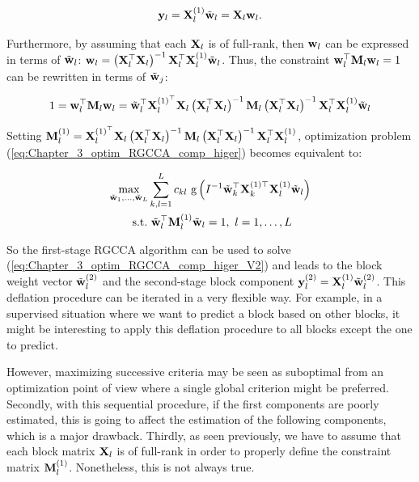 \documentclass[
]{jss}
\begin{document}
\begin{equation}
    \mathbf{y}_l = \mathbf{X}_l^{(1)}\tilde{\mathbf{w}}_l = \mathbf{X}_l\mathbf{w}_l.
\label{eq:Chapter_3_link_between_range_spaces}
\end{equation}

Furthermore, by assuming that each \(\mathbf{X}_l\) is of full-rank, then
\(\mathbf{w}_l\) can be expressed in terms of \(\tilde{\mathbf{w}}_l\):
\(\mathbf{w}_l = \left( \mathbf{X}_l^\top \mathbf{X}_l\right)^{-1}\mathbf{X}_l^\top\mathbf{X}_l^{(1)}\tilde{\mathbf{w}}_l\).
Thus, the constraint \(\mathbf{w}_l^\top\mathbf{M}_l\mathbf{w}_l = 1\) can be rewritten in terms
of \(\tilde{\mathbf{w}}_j\):

\begin{equation}
    1 = \mathbf{w}_l^\top\mathbf{M}_l\mathbf{w}_l = \tilde{\mathbf{w}}_l^\top\mathbf{X}_l^{(1)^\top} \mathbf{X}_l \left( \mathbf{X}_l^\top \mathbf{X}_l\right)^{-1}\mathbf{M}_l\left( \mathbf{X}_l^\top \mathbf{X}_l\right)^{-1}\mathbf{X}_l^\top\mathbf{X}_l^{(1)}\tilde{\mathbf{w}}_l
\label{eq:Chapter_3_deflation_constraint_reformulation}
\end{equation}

Setting
\(\mathbf{M}_l^{(1)} = \mathbf{X}_l^{(1)^\top} \mathbf{X}_l \left( \mathbf{X}_l^\top \mathbf{X}_l\right)^{-1}\mathbf{M}_l\left( \mathbf{X}_l^\top \mathbf{X}_l\right)^{-1}\mathbf{X}_l^\top\mathbf{X}_l^{(1)}\),
optimization problem (\ref{eq:Chapter_3_optim_RGCCA_comp_higer}) becomes
equivalent to:

\begin{equation}
    \begin{gathered}
        \underset{\tilde{\mathbf{w}}_1, \ldots, \tilde{\mathbf{w}}_L}{\text{max}} \sum_{\substack{k, l = 1}}^L c_{kl} \text{ g}\left(I^{-1}\tilde{\mathbf{w}}_k^\top \mathbf{X}_k^{(1)\top} \mathbf{X}_l^{(1)} \tilde{\mathbf{w}}_l \right)
        \\
        \text{~s.t.~} \tilde{\mathbf{w}}_l^\top\mathbf{M}_l^{(1)}\tilde{\mathbf{w}}_l = 1, ~l = 1, \ldots, L
    \label{eq:Chapter_3_optim_RGCCA_comp_higer_V2}
    \end{gathered}
\end{equation}

So the first-stage RGCCA algorithm can be used to solve
(\ref{eq:Chapter_3_optim_RGCCA_comp_higer_V2}) and leads to the block
weight vector \(\tilde{\mathbf{w}}_l^{(2)}\) and the second-stage block
component \(\mathbf{y}_l^{(2)} = \mathbf{X}_l^{(1)}\tilde{\mathbf{w}}_l^{(2)}\). This deflation
procedure can be iterated in a very flexible way. For example, in a
supervised situation where we want to predict a block based on other
blocks, it might be interesting to apply this deflation procedure to all
blocks except the one to predict.

However, maximizing successive criteria may be seen as suboptimal from
an optimization point of view where a single global criterion might be
preferred. Secondly, with this sequential procedure, if the first
components are poorly estimated, this is going to affect the estimation
of the following components, which is a major drawback. Thirdly, as seen
previously, we have to assume that each block matrix \(\mathbf{X}_l\) is of
full-rank in order to properly define the constraint matrix
\(\mathbf{M}_l^{(1)}\). Nonetheless, this is not always true.
\end{document}

